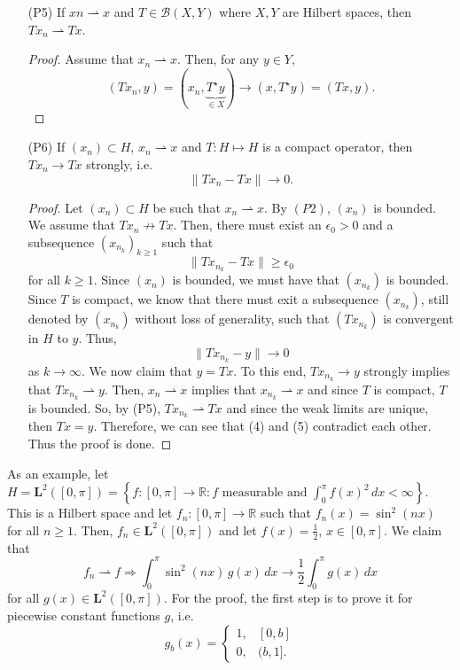 \documentclass[12pt]{article}
\newcommand{\R}{{\mathbb R}}
\newcommand{\B}{\mathscr{B}}
\newcommand{\dint}{\displaystyle\int}
\newcommand{\ml}{\mathbf{L}}
\newcommand{\sbs}{\subset}
\newcommand{\Ts}{T^{\star}}
\newcommand{\weak}{\rightharpoonup}
\begin{document}
\begin{enumerate}[topsep=-15pt]
\begin{proof}
\end{proof}
\item[(P5)] If $xn \weak x$ and $T \in \B(X, Y)$ where $X, Y$ are Hilbert spaces, then $Tx_n \weak Tx$. 
\begin{proof}
Assume that $x_n \weak x$. Then, for any $y \in Y$, 
\[ (Tx_n, y) = (x_n, \underbrace{\Ts y}_{\in X}) \to (x, \Ts y) = (Tx, y).\]
\end{proof}
\item[(P6)] If $(x_n) \sbs H$, $x_n \weak x$ and $T: H \mapsto H$ is a compact operator, then $Tx_n \to Tx$ strongly, i.e. 
\[ \| Tx_n - Tx \| \to 0.\]
\begin{proof}
Let $(x_n) \sbs H$ be such that $x_n \weak x$. By $(P2)$, $(x_n)$ is bounded. We assume that $Tx_n \not\to Tx$. Then, there must exist an $\epsilon_0 > 0$ and a subsequence $(x_{n_k})_{k \geq 1}$ such that 
\begin{equation}
\| Tx_{n_k} - Tx \| \geq \epsilon_0
\end{equation}
 for all $k \geq 1$. Since $(x_n)$ is bounded, we must have that $(x_{n_k})$ is bounded.  Since $T$ is compact, we know that there must exit a subsequence $(x_{n_k})$, still denoted by $(x_{n_k})$ without loss of generality, such that $(Tx_{n_k})$ is convergent in $H$ to $y$. Thus, 
 \begin{equation}
 \| Tx_{n_k} - y \| \to 0
 \end{equation}
 as $k \to \infty$. We now claim that $y = Tx$. To this end, $Tx_{n_k} \to y$ strongly implies that $Tx_{n_k} \weak y$. Then, $x_n \weak x$ implies that $x_{n_k} \weak x$ and since $T$ is compact, $T$ is bounded. So, by (P5), $Tx_{n_k} \weak Tx$ and since the weak limits are unique, then $Tx = y$. Therefore, we can see that (4) and (5) contradict each other. Thus the proof is done. 
\end{proof}
\end{enumerate}
As an example, let $H = \ml^2([0, \pi]) = \left\lbrace f: [0, \pi] \to \R : f \text{ measurable  and } \dint_{0}^{\pi} f(x)^2 \, dx < \infty \right\rbrace$. This is a Hilbert space and let $f_n: [0, \pi] \to \R$ such that $f_n(x) = \sin^2(nx)$ for all $n \geq 1$. Then, $f_n \in \ml^2([0, \pi])$ and let $f(x) = \frac{1}{2}$, $x \in [0, \pi]$. We claim that 
\[ f_n \weak f \Longrightarrow \dint_0^{\pi} \sin^2(nx) \, g(x) \, dx \to \frac{1}{2} \dint_{0}^{\pi} g(x) \, dx\]
for all $g(x) \in \ml^2([0, \pi])$. For the proof, the first step is to prove it for piecewise constant functions $g$, i.e.
\[ g_b(x) = \begin{cases}
1, & [0, b]\\
0, & (b, 1].
\end{cases}\]
\end{document}
